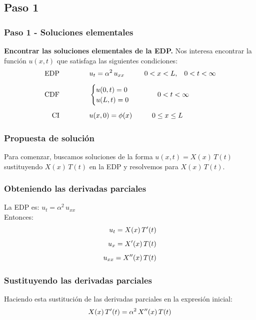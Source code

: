 \documentclass[12pt]{beamer}
\begin{document}
\subsection{Paso 1}

\begin{frame}
\frametitle{Paso 1 - Soluciones elementales}
\textbf{Encontrar las soluciones elementales de la EDP.}
\pause
Nos interesa encontrar la función $u (x, t)$ que satisfaga las siguientes condiciones:
\pause
\begin{align*}
\mbox{EDP} \hspace{1.5cm} &u_{t} = \alpha^{2} \, u_{xx} \hspace{1cm} 0 < x < L, \hspace{0.3cm} 0 < t < \infty \\[0.5em] 
\mbox{CDF} \hspace{1.5cm} &\begin{cases}
    u (0, t) = 0 \\
    u (L, t) = 0
    \end{cases}
    \hspace{1cm}
    0 < t < \infty \\[0.5em]
\mbox{CI} \hspace{1.5cm} & u (x, 0) = \phi (x) \hspace{1cm} 0 \leq x \leq L
\end{align*}
\end{frame}
\begin{frame}
\frametitle{Propuesta de solución}
Para comenzar, buscamos soluciones de la forma $u (x, t) = X(x) \, T (t)$ sustituyendo $X (x) \, T (t)$ en la EDP y resolvemos para  $X (x) \, T (t)$.
\end{frame}
\begin{frame}
\frametitle{Obteniendo las derivadas parciales}
La EDP es: $u_{t} = \alpha^{2} \, u_{xx}$
\\
\bigskip
\pause
Entonces:
\pause
\begin{eqnarray*}
\begin{aligned}
u_{t} = X (x) \, {T}^{\prime} (t) \\[0.5em]
u_{x} = {X}^{\prime} (x) \, T (t) \\[0.5em]
u_{xx} = {X}^{\prime \prime} (x) \, T (t)
\end{aligned}
\end{eqnarray*}
\end{frame}
\begin{frame}
\frametitle{Sustituyendo las derivadas parciales}
Haciendo esta sustitución de las derivadas parciales en la expresión inicial:
\pause
\begin{align*}
X (x) \, {T}^{\prime} (t) = \alpha^{2} \, {X}^{\prime \prime} (x) \, T (t)
\end{align*}
\end{frame}
\end{document}
